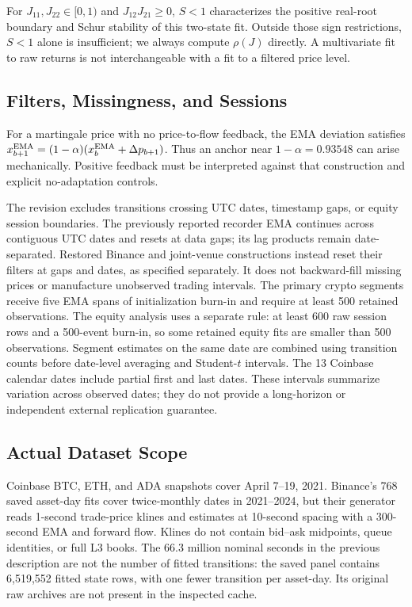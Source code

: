 \documentclass[12pt]{article}
\theoremstyle{definition}
\theoremstyle{remark}
\begin{document}
For $J_{11},J_{22}\in[0,1)$ and $J_{12}J_{21}\ge0$, $S<1$ characterizes the positive real-root boundary and Schur stability of this two-state fit. Outside those sign restrictions, $S<1$ alone is insufficient; we always compute $\rho(J)$ directly. A multivariate fit to raw returns is not interchangeable with a fit to a filtered price level.

\subsection{Filters, Missingness, and Sessions}
For a martingale price with no price-to-flow feedback, the EMA deviation satisfies $x_{b+1}^{\rm EMA}=(1-\alpha)(x_b^{\rm EMA}+\Delta p_{b+1})$. Thus an anchor near $1-\alpha=0.93548$ can arise mechanically. Positive feedback must be interpreted against that construction and explicit no-adaptation controls.

The revision excludes transitions crossing UTC dates, timestamp gaps, or equity session boundaries. The previously reported recorder EMA continues across contiguous UTC dates and resets at data gaps; its lag products remain date-separated. Restored Binance and joint-venue constructions instead reset their filters at gaps and dates, as specified separately. It does not backward-fill missing prices or manufacture unobserved trading intervals. The primary crypto segments receive five EMA spans of initialization burn-in and require at least 500 retained observations. The equity analysis uses a separate rule: at least 600 raw session rows and a 500-event burn-in, so some retained equity fits are smaller than 500 observations. Segment estimates on the same date are combined using transition counts before date-level averaging and Student-$t$ intervals. The 13 Coinbase calendar dates include partial first and last dates. These intervals summarize variation across observed dates; they do not provide a long-horizon or independent external replication guarantee.

\subsection{Actual Dataset Scope}
Coinbase BTC, ETH, and ADA snapshots cover April 7--19, 2021. Binance's 768 saved asset-day fits cover twice-monthly dates in 2021--2024, but their generator reads 1-second trade-price klines and estimates at 10-second spacing with a 300-second EMA and forward flow. Klines do not contain bid--ask midpoints, queue identities, or full L3 books. The 66.3 million nominal seconds in the previous description are not the number of fitted transitions: the saved panel contains 6,519,552 fitted state rows, with one fewer transition per asset-day. Its original raw archives are not present in the inspected cache.
\end{document}

